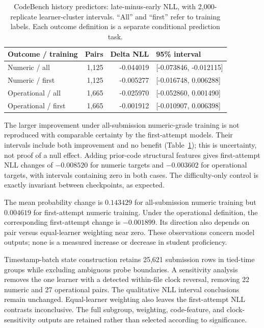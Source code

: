\documentclass[11pt]{article}
\newcommand{\1}{\mathbb{I}}
\begin{document}
\begin{table}[htbp]
\centering
\caption{CodeBench history predictors: late-minus-early NLL, with 2,000-replicate learner-cluster intervals. ``All'' and ``first'' refer to training labels. Each outcome definition is a separate conditional prediction task.}
\label{tab:codebench}
\begin{tabular}{lrrl}
\toprule
Outcome / training & Pairs & Delta NLL & 95\% interval \\
\midrule
Numeric / all & 1,125 & -0.044019 & [-0.073846, -0.012115] \\
Numeric / first & 1,125 & -0.005277 & [-0.016748, 0.006288] \\
Operational / all & 1,665 & -0.025970 & [-0.052860, 0.001490] \\
Operational / first & 1,665 & -0.001912 & [-0.010907, 0.006398] \\
\bottomrule
\end{tabular}
\end{table}

The larger improvement under all-submission numeric-grade training is not reproduced with comparable certainty by the first-attempt models. Their intervals include both improvement and no benefit (Table~\ref{tab:codebench}); this is uncertainty, not proof of a null effect. Adding prior-code structural features gives first-attempt NLL changes of $-0.008520$ for numeric targets and $-0.003602$ for operational targets, with intervals containing zero in both cases. The difficulty-only control is exactly invariant between checkpoints, as expected.

The mean probability change is $0.143429$ for all-submission numeric training but $0.004619$ for first-attempt numeric training. Under the operational definition, the corresponding first-attempt change is $-0.001899$. Its direction also depends on pair versus equal-learner weighting near zero. These observations concern model outputs; none is a measured increase or decrease in student proficiency.

Timestamp-batch state construction retains 25,621 submission rows in tied-time groups while excluding ambiguous probe boundaries. A sensitivity analysis removes the one learner with a detected within-file clock reversal, removing 22 numeric and 27 operational pairs. The qualitative NLL interval conclusions remain unchanged. Equal-learner weighting also leaves the first-attempt NLL contrasts inconclusive. The full subgroup, weighting, code-feature, and clock-sensitivity outputs are retained rather than selected according to significance.
\end{document}
